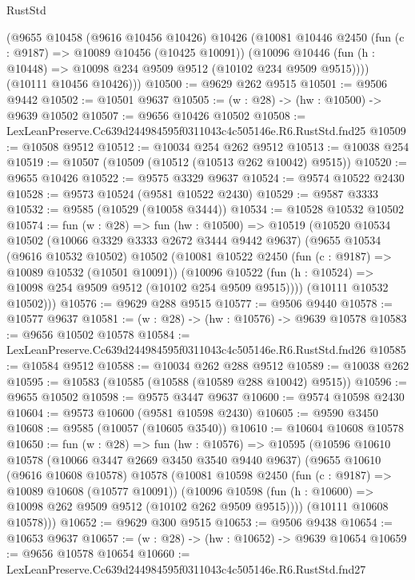 \begin{lexlean}{RustStd}
\begin{coremodule}
      (@9655
        @10458
        (@9616 @10456 @10426)
        @10426
        (@10081
          @10446
          @2450
          (fun (c : @9187) => @10089 @10456 (@10425 @10091))
          (@10096 @10446 (fun (h : @10448) => @10098 @234 @9509 @9512 (@10102 @234 @9509 @9515))))
        (@10111 @10456 @10426)))
@10500 := @9629 @262 @9515
@10501 := @9506 @9442
@10502 := @10501 @9637
@10505 := (w : @28) -> (hw : @10500) -> @9639 @10502
@10507 := @9656 @10426 @10502
@10508 := LexLeanPreserve.Cc639d244984595f0311043c4c505146e.R6.RustStd.fnd25
@10509 := @10508 @9512
@10512 := @10034 @254 @262 @9512
@10513 := @10038 @254
@10519 := @10507 (@10509 (@10512 (@10513 @262 @10042) @9515))
@10520 := @9655 @10426
@10522 := @9575 @3329 @9637
@10524 := @9574 @10522 @2430
@10528 := @9573 @10524 (@9581 @10522 @2430)
@10529 := @9587 @3333
@10532 := @9585 (@10529 (@10058 @3444))
@10534 := @10528 @10532 @10502
@10574 := fun (w : @28) =>
  fun (hw : @10500) =>
  @10519
    (@10520
      @10534
      @10502
      (@10066 @3329 @3333 @2672 @3444 @9442 @9637)
      (@9655
        @10534
        (@9616 @10532 @10502)
        @10502
        (@10081
          @10522
          @2450
          (fun (c : @9187) => @10089 @10532 (@10501 @10091))
          (@10096 @10522 (fun (h : @10524) => @10098 @254 @9509 @9512 (@10102 @254 @9509 @9515))))
        (@10111 @10532 @10502)))
@10576 := @9629 @288 @9515
@10577 := @9506 @9440
@10578 := @10577 @9637
@10581 := (w : @28) -> (hw : @10576) -> @9639 @10578
@10583 := @9656 @10502 @10578
@10584 := LexLeanPreserve.Cc639d244984595f0311043c4c505146e.R6.RustStd.fnd26
@10585 := @10584 @9512
@10588 := @10034 @262 @288 @9512
@10589 := @10038 @262
@10595 := @10583 (@10585 (@10588 (@10589 @288 @10042) @9515))
@10596 := @9655 @10502
@10598 := @9575 @3447 @9637
@10600 := @9574 @10598 @2430
@10604 := @9573 @10600 (@9581 @10598 @2430)
@10605 := @9590 @3450
@10608 := @9585 (@10057 (@10605 @3540))
@10610 := @10604 @10608 @10578
@10650 := fun (w : @28) =>
  fun (hw : @10576) =>
  @10595
    (@10596
      @10610
      @10578
      (@10066 @3447 @2669 @3450 @3540 @9440 @9637)
      (@9655
        @10610
        (@9616 @10608 @10578)
        @10578
        (@10081
          @10598
          @2450
          (fun (c : @9187) => @10089 @10608 (@10577 @10091))
          (@10096 @10598 (fun (h : @10600) => @10098 @262 @9509 @9512 (@10102 @262 @9509 @9515))))
        (@10111 @10608 @10578)))
@10652 := @9629 @300 @9515
@10653 := @9506 @9438
@10654 := @10653 @9637
@10657 := (w : @28) -> (hw : @10652) -> @9639 @10654
@10659 := @9656 @10578 @10654
@10660 := LexLeanPreserve.Cc639d244984595f0311043c4c505146e.R6.RustStd.fnd27

\end{coremodule}
\end{lexlean}
